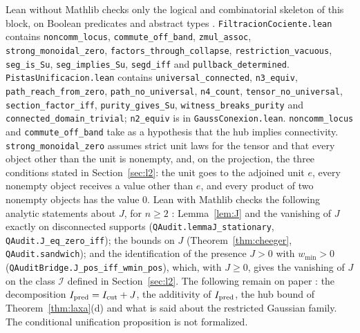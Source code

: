 {\sloppy Lean without Mathlib checks only the logical and combinatorial skeleton of this block, on Boolean predicates and abstract types \stL. \texttt{FiltracionCociente.lean} contains \texttt{noncomm\_locus}, \texttt{commute\_off\_band}, \texttt{zmul\_assoc}, \texttt{strong\_monoidal\_zero}, \texttt{factors\_through\_collapse}, \texttt{restriction\_vacuous}, \texttt{seg\_is\_Su}, \texttt{seg\_implies\_Su}, \texttt{segd\_iff} and \texttt{pullback\_determined}. \texttt{PistasUnificacion.lean} contains \texttt{universal\_connected}, \texttt{n3\_equiv}, \texttt{path\_reach\_from\_zero}, \texttt{path\_no\_universal}, \texttt{n4\_count}, \texttt{tensor\_no\_universal}, \texttt{section\_factor\_iff}, \texttt{purity\_gives\_Su}, \texttt{witness\_breaks\_purity} and \texttt{connected\_domain\_trivial}; \texttt{n2\_equiv} is in \texttt{GaussConexion.lean}. \texttt{noncomm\_locus} and \texttt{commute\_off\_band} take as a hypothesis that the hub implies connectivity. \texttt{strong\_monoidal\_zero} assumes strict unit laws for the tensor and that every object other than the unit is nonempty, and, on the projection, the three conditions stated in Section~\ref{sec:l2}: the unit goes to the adjoined unit $e$, every nonempty object receives a value other than $e$, and every product of two nonempty objects has the value $0$. Lean with Mathlib checks the following analytic statements about $J$, for $n\ge2$ \stM: Lemma~\ref{lem:J} and the vanishing of $J$ exactly on disconnected supports (\texttt{QAudit.lemmaJ\_stationary}, \texttt{QAudit.J\_eq\_zero\_iff}); the bounds on $J$ (Theorem~\ref{thm:cheeger}, \texttt{QAudit.sandwich}); and the identification of the presence $J>0$ with $w_{\min}>0$ (\texttt{QAuditBridge.J\_pos\_iff\_wmin\_pos}), which, with $J\ge0$, gives the vanishing of $J$ on the class $\mathcal I$ defined in Section~\ref{sec:l2}. The following remain on paper \stA: the decomposition $I_{\rm pred}=I_{\rm cut}+J$, the additivity of $I_{\rm pred}$, the hub bound of Theorem~\ref{thm:laxa}(d) and what is said about the restricted Gaussian family. The conditional unification proposition is not formalized.\par}

